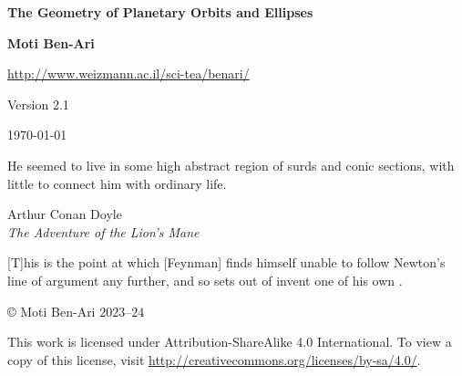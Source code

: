 


\thispagestyle{empty}

\begin{center}
\textbf{\LARGE The Geometry of Planetary Orbits and Ellipses}

\bigskip
\bigskip
\bigskip

\textbf{\Large Moti Ben-Ari}

\bigskip

\url{http://www.weizmann.ac.il/sci-tea/benari/}

\bigskip

Version 2.1

\bigskip

\today

\end{center}

\vspace*{8ex}

\hfill\begin{minipage}{.5\textwidth}
\small He seemed to live in some high abstract region of surds and conic sections, with little to connect him with ordinary life.
\begin{flushright}
Arthur Conan Doyle\\\textit{The Adventure of the Lion’s Mane}
\end{flushright}
\end{minipage}

\vspace*{8ex}

\hfill\begin{minipage}{.5\textwidth}
[T]his is the point at which [Feynman] finds himself unable to follow Newton's line of argument any further, and so sets out of invent one of his own \cite[p.~111]{lost}.
\end{minipage}

\vfill

\begin{center}
\copyright{} Moti Ben-Ari $2023$--$24$
\end{center}
 
\begin{small}
This work is licensed under Attribution-ShareAlike 4.0 International. To view a copy of this license, visit \url{http://creativecommons.org/licenses/by-sa/4.0/}.
\end{small}

